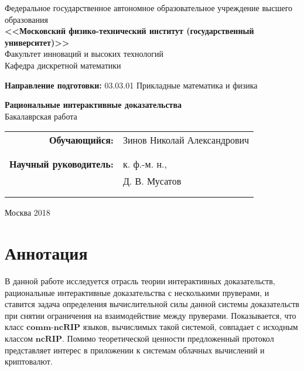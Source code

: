 \documentclass[14pt, a4paper]{extreport}
\begin{document}
\begin{center}
\hfill \break
\footnotesize{Федеральное государственное автономное образовательное учреждение 
высшего образования}\\ 
\small{\textbf{<<Московский физико-технический институт (государственный университет)>>}}\\
\hfill \break
\normalsize{Факультет инноваций и высоких технологий}\\
\normalsize{Кафедра дискретной математики}\\
\end{center}
\footnotesize{\textbf{Направление подготовки:} 03.03.01 Прикладные математика и физика}\\
\hfill \break
\hfill \break
\hfill \break
\hfill \break
\begin{center}
\large{\textbf{Рациональные интерактивные доказательства}}\\
\normalsize{Бакалаврская работа}\\
\hfill \break
\hfill \break
\end{center}
 
\hfill \break
 
\begin{flushright}
\footnotesize{ 
\begin{tabular}{rl}
\textbf{Обучающийся:} & Зинов Николай Александрович \\
 & \underline{\hspace{3cm}} \\\\
\textbf{Научный руководитель:} & к. ф.-м. н., \\
            & Д. В. Мусатов \\
 & \underline{\hspace{3cm}} \\\\
\end{tabular}
}
\end{flushright}

\hfill \break
\hfill \break
\hfill \break
\hfill \break
\hfill \break
\hfill \break
\begin{center} Москва 2018 \end{center}
\thispagestyle{empty} %
 
 
\newpage
\normalsize

\chapter*{Аннотация}
В данной работе исследуется отрасль теории интерактивных доказательств, рациональные интерактивные доказательства с несколькими пруверами, и ставится задача определения вычислительной силы данной системы доказательств при снятии ограничения на взаимодействие между пруверами. Показывается, что класс $\textbf{comm-ncRIP}$ языков, вычислимых такой системой, совпадает с исходным классом $\textbf{ncRIP}$. Помимо теоретической ценности предложенный протокол представляет интерес в приложении к системам облачных вычислений и криптовалют.
\tableofcontents{}
\end{document}
